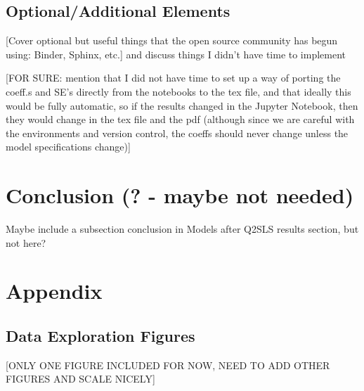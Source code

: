 \documentclass[12pt]{article}
\begin{document}
\subsection{Optional/Additional Elements}
\textcolor{BrickRed}{[Cover optional but useful things that the open source community has begun using: Binder, Sphinx, etc.] and discuss things I didn't have time to implement}

\textcolor{BrickRed}{[FOR SURE: mention that I did not have time to set up a way of porting the coeff.s and SE's directly from the notebooks to the tex file, and that ideally this would be fully automatic, so if the results changed in the Jupyter Notebook, then they would change in the tex file and the pdf (although since we are careful with the environments and version control, the coeffs should never change unless the model specifications change)]}


\newpage
\section{Conclusion (? - maybe not needed)}
Maybe include a subsection conclusion in Models after Q2SLS results section, but not here?

\newpage
\section{Appendix}

\subsection{Data Exploration Figures} \label{appendix_figs}
\textcolor{BrickRed}{[ONLY ONE FIGURE INCLUDED FOR NOW, NEED TO ADD OTHER FIGURES AND SCALE NICELY]}
\end{document}
